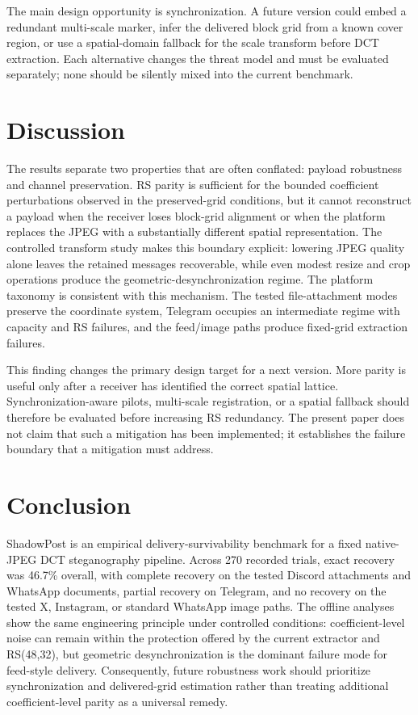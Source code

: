 \documentclass[conference]{IEEEtran}
\newcommand{\safeSection}[1]{\Needspace{5\baselineskip}\section{#1}}
\begin{document}
The main design opportunity is synchronization. A future version could embed a redundant multi-scale marker, infer the delivered block grid from a known cover region, or use a spatial-domain fallback for the scale transform before DCT extraction. Each alternative changes the threat model and must be evaluated separately; none should be silently mixed into the current benchmark.

\safeSection{Discussion}
The results separate two properties that are often conflated: payload robustness and channel preservation. RS parity is sufficient for the bounded coefficient perturbations observed in the preserved-grid conditions, but it cannot reconstruct a payload when the receiver loses block-grid alignment or when the platform replaces the JPEG with a substantially different spatial representation. The controlled transform study makes this boundary explicit: lowering JPEG quality alone leaves the retained messages recoverable, while even modest resize and crop operations produce the geometric-desynchronization regime. The platform taxonomy is consistent with this mechanism. The tested file-attachment modes preserve the coordinate system, Telegram occupies an intermediate regime with capacity and RS failures, and the feed/image paths produce fixed-grid extraction failures.

This finding changes the primary design target for a next version. More parity is useful only after a receiver has identified the correct spatial lattice. Synchronization-aware pilots, multi-scale registration, or a spatial fallback should therefore be evaluated before increasing RS redundancy. The present paper does not claim that such a mitigation has been implemented; it establishes the failure boundary that a mitigation must address.

\safeSection{Conclusion}
ShadowPost is an empirical delivery-survivability benchmark for a fixed native-JPEG DCT steganography pipeline. Across 270 recorded trials, exact recovery was 46.7\% overall, with complete recovery on the tested Discord attachments and WhatsApp documents, partial recovery on Telegram, and no recovery on the tested X, Instagram, or standard WhatsApp image paths. The offline analyses show the same engineering principle under controlled conditions: coefficient-level noise can remain within the protection offered by the current extractor and RS(48,32), but geometric desynchronization is the dominant failure mode for feed-style delivery. Consequently, future robustness work should prioritize synchronization and delivered-grid estimation rather than treating additional coefficient-level parity as a universal remedy.
\end{document}
